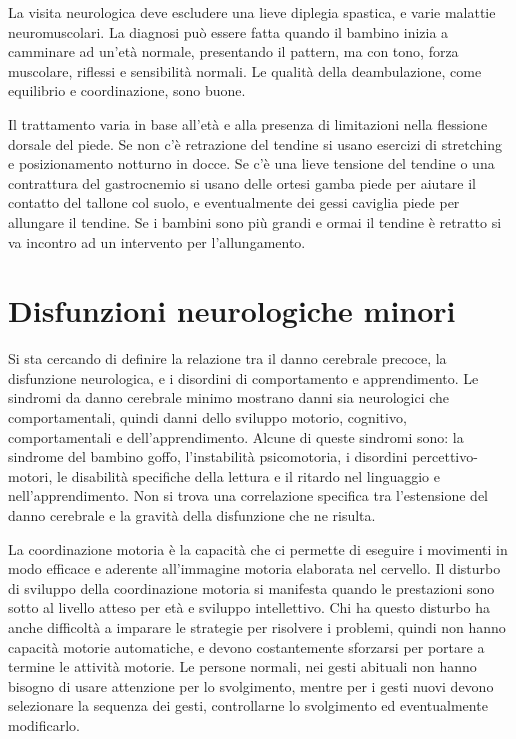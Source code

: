 La visita neurologica deve escludere una lieve diplegia spastica, e varie malattie neuromuscolari. La diagnosi può essere fatta quando
il bambino inizia a camminare ad un'età normale, presentando il pattern, ma con tono, forza muscolare, riflessi e sensibilità normali.
Le qualità della deambulazione, come equilibrio e coordinazione, sono buone.

Il trattamento varia in base all'età e alla presenza di limitazioni nella flessione dorsale del piede.
Se non c'è retrazione del tendine si usano esercizi di stretching e posizionamento notturno in docce.
Se c'è una lieve tensione del tendine o una contrattura del gastrocnemio si usano delle ortesi gamba piede per aiutare il contatto del
tallone col suolo, e eventualmente dei gessi caviglia piede per allungare il tendine.
Se i bambini sono più grandi e ormai il tendine è retratto si va incontro ad un intervento per l'allungamento. 

\chapter{Disfunzioni neurologiche minori}
Si sta cercando di definire la relazione tra il danno cerebrale precoce, la disfunzione neurologica, e i disordini di comportamento e
apprendimento.
Le sindromi da danno cerebrale minimo mostrano danni sia neurologici che comportamentali, quindi danni dello sviluppo motorio,
cognitivo, comportamentali e dell'apprendimento. Alcune di queste sindromi sono: la sindrome del bambino goffo, l'instabilità
psicomotoria, i disordini percettivo-motori, le disabilità specifiche della lettura e il ritardo nel linguaggio e nell'apprendimento.
Non si trova una correlazione specifica tra l'estensione del danno cerebrale e la gravità della disfunzione che ne risulta.

La coordinazione motoria è la capacità che ci permette di eseguire i movimenti in modo efficace e aderente all'immagine motoria
elaborata nel cervello.
Il disturbo di sviluppo della coordinazione motoria si manifesta quando le prestazioni sono sotto al livello atteso per età e sviluppo
intellettivo. Chi ha questo disturbo ha anche difficoltà a imparare le strategie per risolvere i problemi, quindi non hanno capacità
motorie automatiche, e devono costantemente sforzarsi per portare a termine le attività motorie.
Le persone normali, nei gesti abituali non hanno bisogno di usare attenzione per lo svolgimento, mentre per i gesti nuovi devono
selezionare la sequenza dei gesti, controllarne lo svolgimento ed eventualmente modificarlo.

